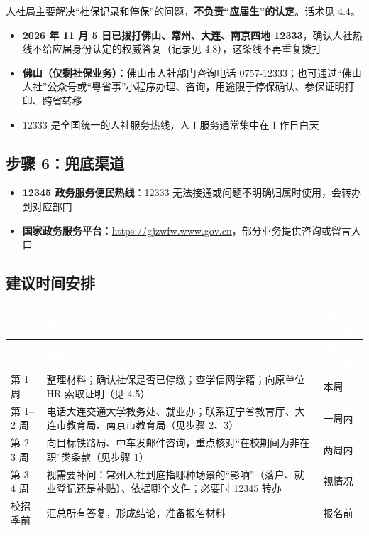 \documentclass[UTF8,fontset=fandol,zihao=-4]{ctexart}
\newcommand{\hc}[1]{\textcolor{white}{\heiti\bfseries #1}}
\begin{document}
人社局主要解决“社保记录和停保”的问题，\textbf{不负责“应届生”的认定}。话术见 4.4。

\begin{itemize}
  \item \textbf{2026 年 11 月 5 日已拨打佛山、常州、大连、南京四地 12333}，确认人社热线不给应届身份认定的权威答复（记录见 4.8），这条线不再重复拨打
  \item \textbf{佛山（仅剩社保业务）}：佛山市人社部门咨询电话 0757-12333；也可通过“佛山人社”公众号或“粤省事”小程序办理、咨询，用途限于停保确认、参保证明打印、跨省转移
  \item 12333 是全国统一的人社服务热线，人工服务通常集中在工作日白天
\end{itemize}

\subsection{步骤 6：兜底渠道}

\begin{itemize}
  \item \textbf{12345 政务服务便民热线}：12333 无法接通或问题不明确归属时使用，会转办到对应部门
  \item \textbf{国家政务服务平台}：\url{https://gjzwfw.www.gov.cn}，部分业务提供咨询或留言入口
\end{itemize}

\subsection{建议时间安排}

\begingroup
{}
\begin{longtable}{@{}P{2.66cm}P{9.42cm}P{3.48cm}@{}}
\hc{阶段} & \hc{事项} & \hc{建议完成时间}\\
\endfirsthead
{}\hc{阶段} & \hc{事项} & \hc{建议完成时间}\\
\endhead
第 1 周 & 整理材料；确认社保是否已停缴；查学信网学籍；向原单位 HR 索取证明（见 4.5） & 本周\\
第 1–2 周 & 电话大连交通大学教务处、就业办；联系辽宁省教育厅、大连市教育局、南京市教育局（见步骤 2、3） & 一周内\\
第 2–3 周 & 向目标铁路局、中车发邮件咨询，重点核对“在校期间为非在职”类条款（见步骤 1） & 两周内\\
第 3–4 周 & 视需要补问：常州人社到底指哪种场景的“影响”（落户、就业登记还是补贴）、依据哪个文件；必要时 12345 转办 & 视情况\\
校招季前 & 汇总所有答复，形成结论，准备报名材料 & 报名前\\
\end{longtable}
\endgroup
\end{document}
